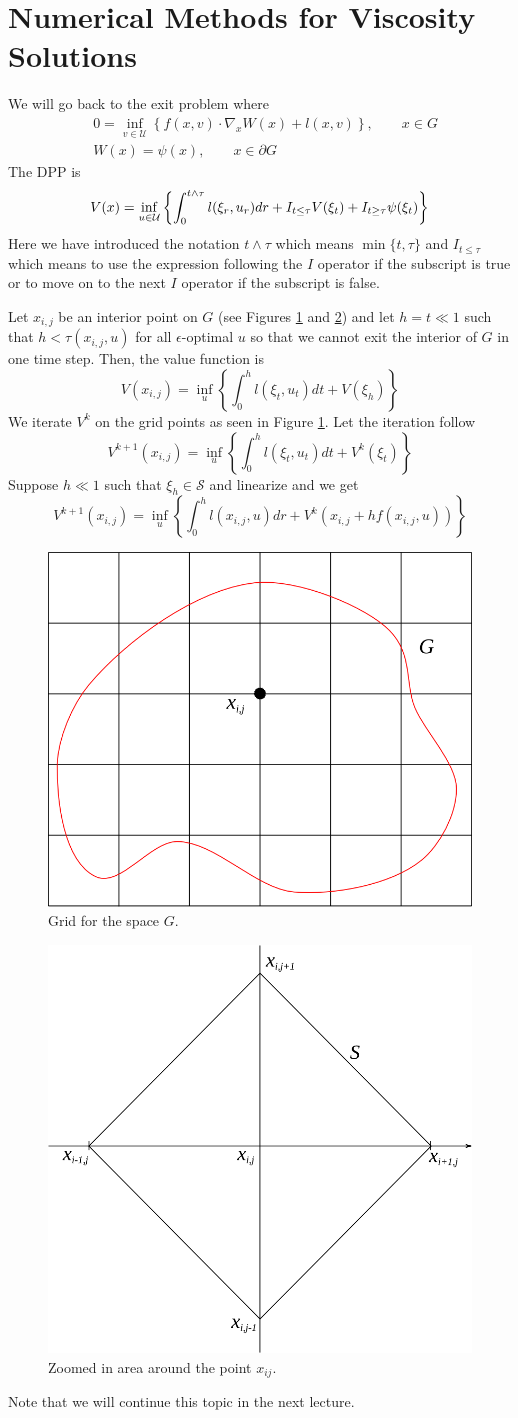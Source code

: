 \section{Numerical Methods for Viscosity Solutions}
We will go back to the exit problem where
\begin{align*}
&0 = \inf_{v\in\mathcal{U}}\left\lbrace f(x,v)\cdot\nabla_xW(x)+l(x,v)\right\rbrace, \qquad x\in G \\
&W(x) = \psi(x), \qquad x\in\partial G
\end{align*}
The DPP is
$$V(x) = \inf_{u\in\mathcal{U}}\left\lbrace \int_0^{t\wedge\tau}l(\xi_r,u_r)dr + I_{t\leq\tau}V(\xi_t) + I_{t\geq\tau}\psi(\xi_t)\right\rbrace$$
Here we have introduced the notation $t\wedge\tau$ which means $\min\{t,\tau\}$ and $I_{t\leq\tau}$ which means to use the expression following the $I$ operator if the subscript is true or to move on to the next $I$ operator if the subscript is false.

Let $x_{i,j}$ be an interior point on $G$ (see Figures \ref{fig:16grid} and \ref{fig:16x}) and let $h=t\ll 1$ such that $h<\tau(x_{i,j},u)$ for all $\epsilon$-optimal $u$ so that we cannot exit the interior of $G$ in one time step. Then, the value function is
$$V(x_{i,j}) = \inf_u\left\lbrace \int_0^hl(\xi_t,u_t)dt+V(\xi_h)\right\rbrace$$
We iterate $V^k$ on the grid points as seen in Figure \ref{fig:16grid}. Let the iteration follow
$$V^{k+1}(x_{i,j}) = \inf_u\left\lbrace \int_0^hl(\xi_t,u_t)dt + V^k(\xi_t)\right\rbrace$$
Suppose $h\ll 1$ such that $\xi_h\in\mathcal{S}$ and linearize and we get
$$V^{k+1}(x_{i,j}) = \inf_u\left\lbrace \int_0^h l(x_{i,j},u)dr+V^k(x_{i,j}+hf(x_{i,j},u))\right\rbrace$$

\begin{figure}[ht!]
	\centering
	\includegraphics[width=.4\textwidth]{images/16grid}
	\caption{Grid for the space $G$.}
	\label{fig:16grid}
\end{figure}

\begin{figure}[ht!]
	\centering
	\includegraphics[width=.4\textwidth]{images/16x}
	\caption{Zoomed in area around the point $x_{ij}$.}
	\label{fig:16x}
\end{figure}

Note that we will continue this topic in the next lecture.

